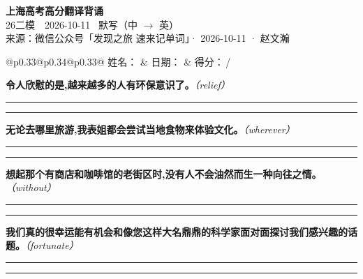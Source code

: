 \documentclass[11pt,a4paper]{article}
\newcommand{\num}[1]{\makebox[1.9em][r]{#1.}\hspace{0.3em}}
\newcommand{\wline}{\noindent\rule{\linewidth}{0.4pt}}
\newcommand{\prompt}[1]{\emph{\textcolor{tipblue}{\small（#1）}}}
\begin{document}
\pagestyle{plain}
\begin{center}
{\LARGE\bfseries 上海高考高分翻译背诵 }\\[0.25em]
{\large 26二模　2026-10-11 \quad\ 默写（中 $\to$ 英）}\\[0.35em]
{\footnotesize 来源：微信公众号「发现之旅 速来记单词」· 2026-10-11 · 赵文瀚}
\end{center}

\vspace{0.4em}
\noindent\begin{tabular}{@{}p{0.33\textwidth}@{}p{0.34\textwidth}@{}p{0.33\textwidth}@{}}
姓名：\underline{\hspace{2.0cm}} & 日期：\underline{\hspace{2.0cm}} & 得分：\underline{\hspace{1.4cm}}\,/ \\
\end{tabular}

\vspace{0.5em}

\vspace{0.8em}
\num{1}\textbf{令人欣慰的是,越来越多的人有环保意识了。}\prompt{relief}

\vspace{0.3em}

\wline\vspace{0.3em}
\wline

\num{2}\textbf{无论去哪里旅游,我表姐都会尝试当地食物来体验文化。}\prompt{wherever}

\vspace{0.3em}

\wline\vspace{0.3em}
\wline

\num{3}\textbf{想起那个有商店和咖啡馆的老街区时,没有人不会油然而生一种向往之情。}\prompt{without}

\vspace{0.3em}

\wline\vspace{0.3em}
\wline

\num{4}\textbf{我们真的很幸运能有机会和像您这样大名鼎鼎的科学家面对面探讨我们感兴趣的话题。}\prompt{fortunate}

\vspace{0.3em}

\wline\vspace{0.3em}
\wline
\end{document}
